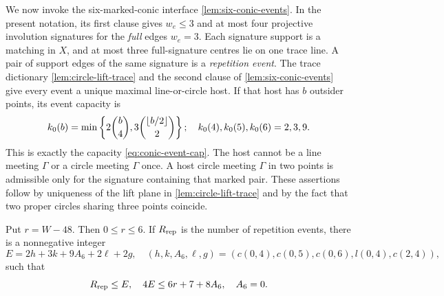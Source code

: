 We now invoke the six-marked-conic interface
\cref{lem:six-conic-events}.  In the present notation, its first clause
gives $w_e\leq3$ and at most four projective involution signatures for the
\emph{full} edges $w_e=3$.  Each signature support is a matching in $X$,
and at most three full-signature centres lie on one trace line.  A pair of
support edges of the same signature is a \emph{repetition event}.
The trace dictionary \cref{lem:circle-lift-trace} and the second clause of
\cref{lem:six-conic-events} give every event a unique maximal
line-or-circle host.  If that host has $b$ outsider points, its event
capacity is
\begin{equation}
 k_0(b)=\min\left\{2\binom b4,
       3\binom{\left\lfloor b/2\right\rfloor}2\right\};\quad
 k_0(4),k_0(5),k_0(6)=2,3,9.                        \label{eq:n13-host-cap}
\end{equation}
This is exactly the capacity \eqref{eq:conic-event-cap}.  The host cannot be
a line meeting $\Gamma$ or a circle meeting $\Gamma$ once.  A host circle
meeting $\Gamma$ in two points is admissible only for the signature
containing that marked pair.  These assertions follow by uniqueness of the
lift plane in \cref{lem:circle-lift-trace} and by the fact that two proper
circles sharing three points coincide.

\begin{lemma}
\label{lem:n13-capacity-gap}
Put $r=W-48$.  Then $0\leq r\leq6$.  If $R_{\rm rep}$ is the number of
repetition events, there is a nonnegative integer
\[
 E=2h+3k+9A_6+2\ell+2g,
\quad
 (h,k,A_6,\ell,g)=(c(0,4),c(0,5),c(0,6),l(0,4),c(2,4)),
\]
such that
\begin{equation}
 R_{\rm rep}\leq E,\quad 4E\leq6r+7+8A_6,\quad A_6=0.
                                                               \label{eq:n13-capacity-gap}
\end{equation}
\end{lemma}


